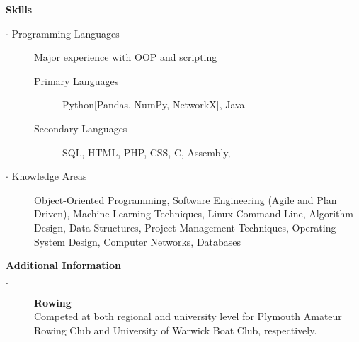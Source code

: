 \documentclass[12pt, a4paper]{article}
\begin{document}
\textbf{Skills}
  \begin{description}
    \item[$\cdot$ Programming Languages] Major experience with OOP and scripting
    \begin{description}
      \item[Primary Languages] Python[Pandas, NumPy, NetworkX], Java
      \item[Secondary Languages] SQL, HTML, PHP, CSS, C, Assembly,
    \end{description}
    \item[$\cdot$ Knowledge Areas] Object-Oriented Programming, 
		Software Engineering (Agile and Plan Driven), 
		  Machine Learning Techniques, 
		  Linux Command Line, 
		  Algorithm Design, 
		  Data Structures,
      Project Management Techniques, 
		  Operating System Design, 
		  Computer Networks, 
		  Databases
  \end{description}
\bigskip

  \textbf{Additional Information}
    \begin{description}
      \item[$\cdot$] \textbf{Rowing} \\Competed at both regional and university level for Plymouth Amateur Rowing Club and University of Warwick Boat Club, respectively.

      \iffalse
      Rowing has taught me the value of team work, and has given me transferable skills including resilience, decision making, and precision, all of which I bring to the workplace.
      Time management $\cdot$ Team work $\cdot$ Resilience $\cdot$ Motivational skills $\cdot$ Quick thinking \\ $\cdot$ Technical planning $\cdot$ Precision
      \fi
    \end{description}
\end{document}
